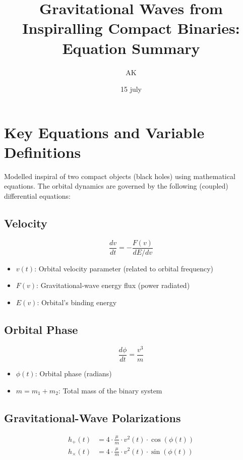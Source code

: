 \documentclass{article}
\title{Gravitational Waves from Inspiralling Compact Binaries: Equation Summary}
\author{AK}
\date{15 july}
\begin{document}
\maketitle

\section*{Key Equations and Variable Definitions}

Modelled inspiral of two compact objects (black holes) using mathematical equations. The orbital dynamics are governed by the following (coupled) differential equations:

\subsection*{Velocity}

\begin{equation}
\frac{dv}{dt} = -\frac{F(v)}{dE/dv}
\end{equation}

\begin{itemize}
  \item \( v(t) \): Orbital velocity parameter (related to orbital frequency)
  \item \( F(v) \): Gravitational-wave energy flux (power radiated)
  \item \( E(v) \): Orbital's binding energy
\end{itemize}

\subsection*{Orbital Phase}

\begin{equation}
\frac{d\phi}{dt} = \frac{v^3}{m}
\end{equation}

\begin{itemize}
  \item \( \phi(t) \): Orbital phase (radians)
  \item \( m = m_1 + m_2 \): Total mass of the binary system
\end{itemize}

\subsection*{Gravitational-Wave Polarizations}

\begin{align}
h_+(t) &= 4 \cdot \frac{\mu}{m} \cdot v^2(t) \cdot \cos(\phi(t)) \\
h_{\times}(t) &= 4 \cdot \frac{\mu}{m} \cdot v^2(t) \cdot \sin(\phi(t))
\end{align}
\end{document}

